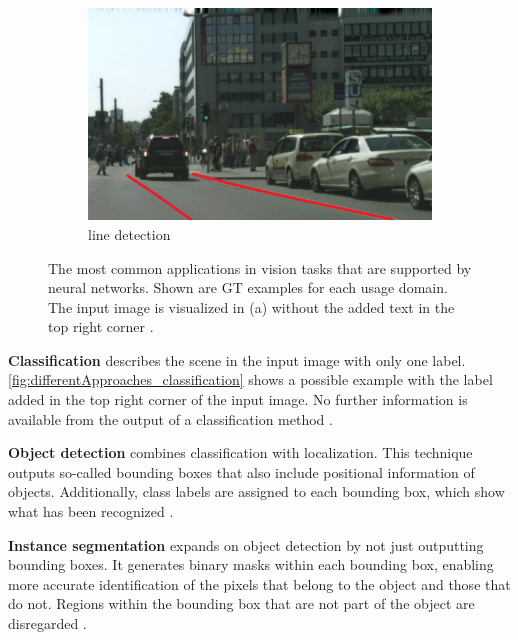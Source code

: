 \begin{figure}[H]
    \hfill
    \begin{subfigure}{0.328\textwidth}
        \includegraphics[width=\linewidth]{PICs/differentApproaches/line_detection.jpg}
        \caption{line detection}
        \label{fig:differentApproaches_line_detection}
    \end{subfigure}

    \caption{The most common applications in vision tasks that are supported by neural networks. Shown are \ac{GT} examples for each usage domain. The input image is visualized in (a) without the added text in the top right corner \cite{panopticsegmentation2019}.}
    \label{fig:differentApproaches}
\end{figure}

\noindent\textbf{Classification} describes the scene in the input image with only one label.
\autoref{fig:differentApproaches_classification} shows a possible example with the label added in the top right corner of the input image.
No further information is available from the output of a classification method \cite{cifar100}.

\vspace{1cm} %

\noindent\textbf{Object detection} combines classification with localization.
This technique outputs so-called bounding boxes that also include positional information of objects.
Additionally, class labels are assigned to each bounding box, which show what has been recognized \cite{panopticsegmentation2019}.

\vspace{1cm} %

\noindent\textbf{Instance segmentation} expands on object detection by not just outputting bounding boxes.
It generates binary masks within each bounding box, enabling more accurate identification of the pixels that belong to the object and those that do not.
Regions within the bounding box that are not part of the object are disregarded \cite{panopticsegmentation2019}.

